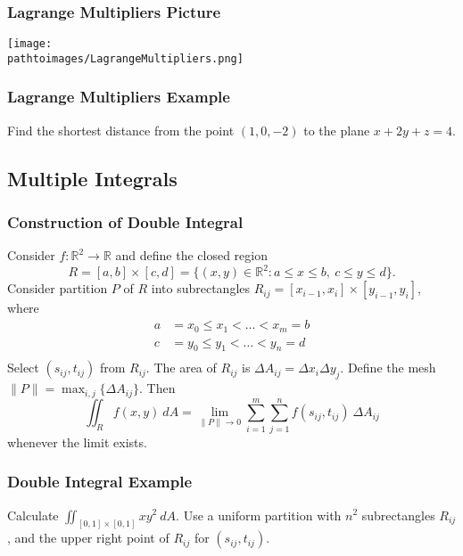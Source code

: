 \documentclass{beamer}
\newcommand{\pathtoimages}{/Users/charlesrambo/Desktop/Bootcamp24/Images}
\begin{document}
\begin{frame}
\frametitle{Lagrange Multipliers Picture}
\begin{center}
\texttt{[image: \\pathtoimages/LagrangeMultipliers.png]}
\end{center}
\end{frame}

\begin{frame}[t]
\frametitle{Lagrange Multipliers Example}
\begin{Example}
Find the shortest distance from the point $(1, 0, -2)$ to the plane $x + 2y + z = 4$.
\end{Example}
\end{frame}

\subsection{Multiple Integrals}

\begin{frame}
\frametitle{Construction of Double Integral}
\tiny
Consider $f:\mathbb{R}^2\to\mathbb{R}$ and define the closed region
$$
R = [a, b]\times [c, d] = \{(x, y)\in\mathbb{R}^2: a\leq x\leq b,\ c\leq y\leq d\}.
$$
Consider partition $P$ of $R$ into subrectangles $R_{ij} = [x_{i - 1}, x_i]\times [y_{i - 1}, y_i]$, where
\begin{align*}
a &= x_0 \leq x_1 < \ldots < x_m = b\\
c &= y_0 \leq y_1 < \ldots < y_n = d\\
\end{align*}
Select $(s_{ij}, t_{ij})$ from $R_{ij}$. The area of $R_{ij}$ is $\Delta A_{ij} = \Delta x_i\Delta y_j$. Define the mesh $\|P\| = \max_{i, j}\{\Delta A_{ij}\}$. Then
$$
\iint_R f(x, y)\ dA = \lim_{\|P\|\to 0} \sum_{i = 1}^m\sum_{j = 1}^n f(s_{ij}, t_{ij})\ \Delta A_{ij}
$$
whenever the limit exists.
\end{frame}

\begin{frame}[t]
\frametitle{Double Integral Example}
\begin{Example}
Calculate $\displaystyle\iint_{[0,1]\times[0, 1]} xy^2\ dA$. Use a uniform partition with $n^2$ subrectangles $R_{ij}$, and the upper right point of $R_{ij}$ for $(s_{ij}, t_{ij})$.
\end{Example}
\end{frame}
\end{document}

